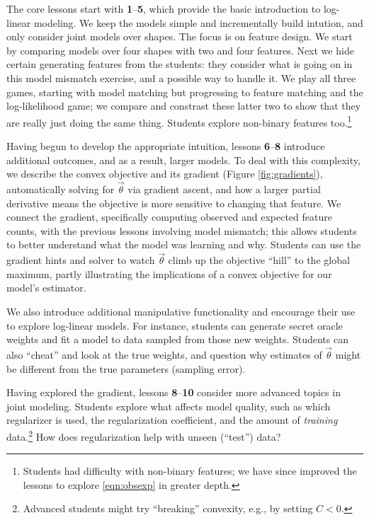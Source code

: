 \documentclass[11pt,letterpaper]{article}
\begin{document}
The core lessons start with \textbf{1}--\textbf{5}, which provide the basic introduction to log-linear modeling. We keep 
the models simple and incrementally build intution, and only consider joint models over shapes. The focus is 
on feature design. We start by comparing models over four shapes with two and four features. 
Next we hide certain generating features from the students: they 
consider what is going on in this model mismatch exercise, and a possible way to handle it. We play all three games, 
starting with model matching but progressing to feature matching and the log-likelihood game; we compare and 
constrast these latter two to show that they are really just doing the same thing. Students explore 
non-binary features too.\footnote{Students had difficulty with non-binary features; 
we have since improved the lessons to explore \eqref{eqn:obsexp} in greater depth.} 

Having begun to develop the appropriate intuition, lessons \textbf{6}--\textbf{8} introduce 
additional outcomes, and as a result, larger models. To deal with this complexity, we describe the convex 
objective and its gradient 
(Figure \ref{fig:gradients}), 
automatically solving for $\vec{\theta}$ via gradient ascent, and how a larger partial derivative means the objective is more 
sensitive to changing that feature. We connect the gradient, specifically computing observed and expected feature 
counts, with the previous lessons involving model mismatch; this allows students to better understand what the 
model was learning and why. 
Students can use the gradient hints and solver to watch $\vec{\theta}$ climb up the objective ``hill'' to the global maximum, 
partly illustrating the implications of a convex objective for our model's estimator.

We also introduce additional manipulative functionality and encourage their use to 
explore log-linear models. For instance, students can generate secret oracle weights and 
fit a model to data sampled from those new weights. Students can also ``cheat'' and look at the true 
weights,  and question why estimates of $\vec{\theta}$ might be different from the true parameters 
(sampling error).

Having explored the gradient, lessons \textbf{8}--\textbf{10} consider more advanced topics in joint 
modeling. Students explore what affects model quality, such as which regularizer is used, the 
regularization coefficient, and the amount of \textit{training} data.\footnote{Advanced 
students might try ``breaking'' convexity, e.g., by setting $C < 0$.} How does regularization help with 
unseen (``test'') data? 
\end{document}
